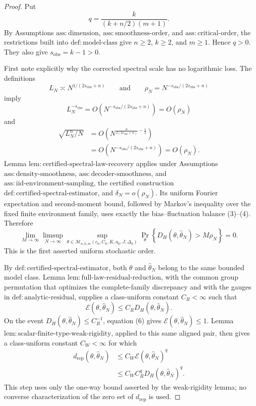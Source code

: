 \documentclass{article}
\begin{document}
\begin{proof}
Put
\[
q=\frac{k}{(k+n/2)(m+1)}.
\tag{1}
\]
By Assumptions \(\mathrm{ass:dimension}\), \(\mathrm{ass:smoothness\text{-}order}\), and \(\mathrm{ass:critical\text{-}order}\), the restrictions built into \(\mathrm{def:model\text{-}class}\) give \(n\geq2\), \(k\geq2\), and \(m\geq1\). Hence \(q>0\). They also give \(s_{\mathrm{obs}}=k-1>0\).

First note explicitly why the corrected spectral scale has no logarithmic loss. The definitions
\[
L_N\asymp N^{1/(2s_{\mathrm{obs}}+n)}
\qquad\text{and}\qquad
\rho_N=N^{-s_{\mathrm{obs}}/(2s_{\mathrm{obs}}+n)}
\tag{2}
\]
imply
\[
L_N^{-s_{\mathrm{obs}}}
=O\!\left(N^{-s_{\mathrm{obs}}/(2s_{\mathrm{obs}}+n)}\right)
=O(\rho_N)
\tag{3}
\]
and
\[
\begin{aligned}
\sqrt{L_N^n/N}
&=O\!\left(
N^{\frac{n}{2(2s_{\mathrm{obs}}+n)}-\frac12}
\right)\\
&=O\!\left(N^{-s_{\mathrm{obs}}/(2s_{\mathrm{obs}}+n)}\right)
=O(\rho_N).
\end{aligned}
\tag{4}
\]
Lemma \(\mathrm{lem:certified\text{-}spectral\text{-}law\text{-}recovery}\) applies under Assumptions \(\mathrm{ass:density\text{-}smoothness}\), \(\mathrm{ass:decoder\text{-}smoothness}\), and \(\mathrm{ass:iid\text{-}environment\text{-}sampling}\), the certified construction \(\mathrm{def:certified\text{-}spectral\text{-}estimator}\), and \(\delta_N=o(\rho_N)\). Its uniform Fourier expectation and second-moment bound, followed by Markov's inequality over the fixed finite environment family, uses exactly the bias--fluctuation balance (3)--(4). Therefore
\[
\lim_{M\to\infty}\limsup_{N\to\infty}
\sup_{\theta\in\mathcal M_{n,k,m}(c_0,C_0,K,a_0,J,\Delta_0)}
\Pr_\theta\!\left\{D_H(\theta,\widehat\theta_N)>M\rho_N\right\}=0.
\tag{5}
\]
This is the first asserted uniform stochastic order.

By \(\mathrm{def:certified\text{-}spectral\text{-}estimator}\), both \(\theta\) and \(\widehat\theta_N\) belong to the same bounded model class. Lemma \(\mathrm{lem:full\text{-}law\text{-}residual\text{-}reduction}\), with the common group permutation that optimizes the complete-family discrepancy and with the gauges in \(\mathrm{def:analytic\text{-}residual}\), supplies a class-uniform constant \(C_R<\infty\) such that
\[
\mathcal E(\theta,\widehat\theta_N)
\leq C_R D_H(\theta,\widehat\theta_N).
\tag{6}
\]
On the event \(D_H(\theta,\widehat\theta_N)\leq C_R^{-1}\), equation (6) gives \(\mathcal E(\theta,\widehat\theta_N)\leq1\). Lemma \(\mathrm{lem:scalar\text{-}finite\text{-}type\text{-}weak\text{-}rigidity}\), applied to this same aligned pair, then gives a class-uniform constant \(C_W<\infty\) for which
\[
\begin{aligned}
d_{\mathrm{rep}}(\theta,\widehat\theta_N)
&\leq C_W\mathcal E(\theta,\widehat\theta_N)^q\\
&\leq C_W C_R^qD_H(\theta,\widehat\theta_N)^q.
\end{aligned}
\tag{7}
\]
This step uses only the one-way bound asserted by the weak-rigidity lemma; no converse characterization of the zero set of \(d_{\mathrm{rep}}\) is used.


\end{proof}
\end{document}
